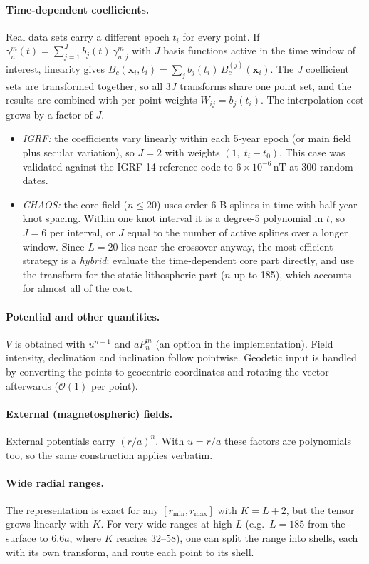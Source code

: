 \documentclass[11pt,a4paper]{article}
\theoremstyle{remark}
\newcommand{\Oh}{\mathcal{O}}
\begin{document}
\paragraph{Time-dependent coefficients.} Real data sets carry a different epoch $t_i$ for every
point. If $\gamma_n^m(t)=\sum_{j=1}^{J}b_j(t)\,\gamma_{n,j}^m$ with $J$ basis functions active
in the time window of interest, linearity gives
$B_c(\mathbf x_i,t_i)=\sum_jb_j(t_i)\,B_c^{(j)}(\mathbf x_i)$. The $J$ coefficient sets are
transformed together, so all $3J$ transforms share one point set, and the results are combined with
per-point weights $W_{ij}=b_j(t_i)$. The interpolation cost grows by a factor of $J$.
\begin{itemize}
\item \emph{IGRF:} the coefficients vary linearly within each 5-year epoch (or main field plus secular
  variation), so $J=2$ with weights $(1,\;t_i-t_0)$. This case was validated against the IGRF-14
  reference code to $6\times10^{-6}$\,nT at 300 random dates.
\item \emph{CHAOS:} the core field ($n\le20$) uses order-6 B-splines in time with half-year knot
  spacing. Within one knot interval it is a degree-5 polynomial in $t$, so $J=6$ per interval, or
  $J$ equal to the number of active splines over a longer window. Since $L=20$ lies near the
  crossover anyway, the most efficient strategy is a \emph{hybrid}: evaluate the time-dependent core
  part directly, and use the transform for the static lithospheric part ($n$ up to 185),
  which accounts for almost all of the cost.
\end{itemize}

\paragraph{Potential and other quantities.} $V$ is obtained with $u^{n+1}$ and $aP_n^m$ (an
option in the implementation). Field intensity, declination and inclination follow pointwise. Geodetic
input is handled by converting the points to geocentric coordinates and rotating the vector afterwards
($\Oh(1)$ per point).

\paragraph{External (magnetospheric) fields.} External potentials carry $(r/a)^{n}$. With
$u=r/a$ these factors are polynomials too, so the same construction applies verbatim.

\paragraph{Wide radial ranges.} The representation is exact for any $[r_{\min},r_{\max}]$ with
$K=L+2$, but the tensor grows linearly with $K$. For very wide ranges at high $L$ (e.g.\
$L=185$ from the surface to $6.6a$, where $K$ reaches $32$--$58$), one can split the range into
shells, each with its own transform, and route each point to its shell.
\end{document}
